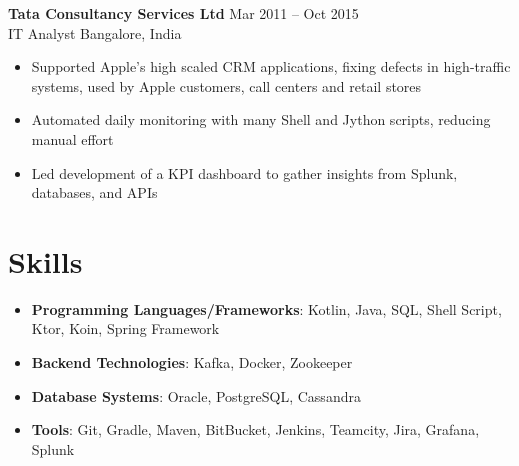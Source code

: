 \documentclass[a4paper,9pt]{article}  %
\begin{document}
\textbf{Tata Consultancy Services Ltd} \hfill Mar 2011 -- Oct 2015\\
IT Analyst \hfill Bangalore, India \vspace{-5pt}\\
\begin{itemize}[left=0pt, label=\textbullet, itemsep=0pt, parsep=0pt, topsep=0pt, partopsep=0pt]
    \item Supported Apple’s high scaled CRM applications, fixing defects in high-traffic systems, used by Apple customers, call centers and retail stores
    \item Automated daily monitoring with many Shell and Jython scripts, reducing manual effort
    \item Led development of a KPI dashboard to gather insights from Splunk, databases, and APIs
\end{itemize}
\vspace{8pt}


\section*{Skills}

\begin{itemize}[left=0pt, label=\textbullet, itemsep=0pt, parsep=0pt, topsep=0pt, partopsep=0pt]
    \item \textbf{Programming Languages/Frameworks}: Kotlin, Java, SQL, Shell Script, Ktor, Koin, Spring Framework
    \item \textbf{Backend Technologies}: Kafka, Docker, Zookeeper
    \item \textbf{Database Systems}: Oracle, PostgreSQL, Cassandra
    \item \textbf{Tools}: Git, Gradle, Maven, BitBucket, Jenkins, Teamcity, Jira, Grafana, Splunk
\end{itemize}
\end{document}
